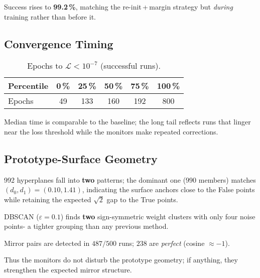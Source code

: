 Success rises to \textbf{99.2\,\%}, matching the re-init\,+\,margin
strategy but \emph{during} training rather than before it.

\subsection*{Convergence Timing}

\begin{table}[ht]
\centering
\caption{Epochs to $\mathcal L<10^{-7}$ (successful runs).}
\label{tab:relu1-monitor-epochs}
\begin{tabular}{lccccc}
\toprule
Percentile & 0\,\% & 25\,\% & 50\,\% & 75\,\% & 100\,\% \\ \midrule
Epochs & 49 & 133 & 160 & 192 & 800 \\
\bottomrule
\end{tabular}
\end{table}

Median time is comparable to the baseline; the long tail reflects runs
that linger near the loss threshold while the monitors make repeated
corrections.

\subsection*{Prototype-Surface Geometry}

\begin{description}[leftmargin=2em]
  \item[Distance clusters]
        992 hyperplanes fall into \textbf{two} patterns; the dominant
        one ($990$ members) matches $(d_{0},d_{1})\!=\!(0.10,1.41)$,
        indicating the surface anchors close to the False points while
        retaining the expected $\sqrt2$ gap to the True points.
  \item[Weight clusters]
        DBSCAN ($\varepsilon=0.1$) finds \textbf{two} sign-symmetric
        weight clusters with only four noise points-
        a tighter grouping than any previous method.
  \item[Mirror symmetry]
        Mirror pairs are detected in $487/500$ runs; $238$ are
        \emph{perfect} (cosine $\approx-1$).
\end{description}

Thus the monitors do not disturb the prototype geometry; if anything,
they strengthen the expected mirror structure.


